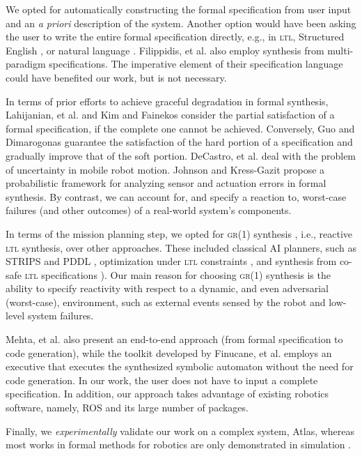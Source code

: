 
We opted for automatically constructing the formal specification from user input and an \emph{a priori} description of the system.
Another option would have been asking the user to write the entire formal specification directly, e.g., in \textsc{ltl}, Structured English \cite{JFRKG2012ICRA}, or natural language \cite{Lignos2015AURO}.
Filippidis, et al. \cite{Filippidis2015SYNT} also employ synthesis from multi-paradigm specifications.
The imperative element of their specification language could have benefited our work, but is not necessary.

In terms of prior efforts to achieve graceful degradation in formal synthesis, Lahijanian, et al. \cite{Kavraki2015AAAI} and Kim and Fainekos \cite{Fainekos2014ICRA} consider the partial satisfaction of a formal specification, if the complete one cannot be achieved.
Conversely, Guo and Dimarogonas \cite{Dimos2014ICRA} guarantee the satisfaction of the hard portion of a specification and gradually improve that of the soft portion.
DeCastro, et al. \cite{Jon2015ICRA} deal with the problem of uncertainty in mobile robot motion.
Johnson and Kress-Gazit \cite{Ben2015IJRR} propose a probabilistic framework for analyzing sensor and actuation errors in formal synthesis.
By contrast, we can account for, and specify a reaction to, worst-case failures (and other outcomes) of a real-world system's components.

In terms of the mission planning step, we opted for \textsc{gr(1)} synthesis \cite{Bloem2012GR1}, i.e., reactive \textsc{ltl} synthesis, over other approaches.
These included classical AI planners, such as STRIPS \cite{STRIPS1971AI} and PDDL \cite{PDDL1998TR}, optimization under \textsc{ltl} constraints \cite{Wolff2014ICRA}, and synthesis from co-safe \textsc{ltl} specifications \cite{Kavraki2015AAAI, Kavraki2015ICRA, Belta2014TAC}).
Our main reason for choosing \textsc{gr(1)} synthesis is the ability to specify reactivity with respect to a dynamic, and even adversarial (worst-case), environment, such as external events sensed by the robot and low-level system failures.

Mehta, et al.\cite{Ankur2015ISRR} also present an end-to-end approach (from formal specification to code generation), while the toolkit developed by Finucane, et al. \cite{Finucane2010IROS} employs an executive that executes the synthesized symbolic automaton without the need for code generation.
In our work, the user does not have to input a complete specification.
In addition, our approach takes advantage of existing robotics software, namely, ROS and its large number of packages.

Finally, we \emph{experimentally} validate our work on a complex system, Atlas, whereas most works in formal methods for robotics are only demonstrated in simulation \cite{Jon2015ICRA, Kavraki2015ICRA, Topcu2011RAM}.


